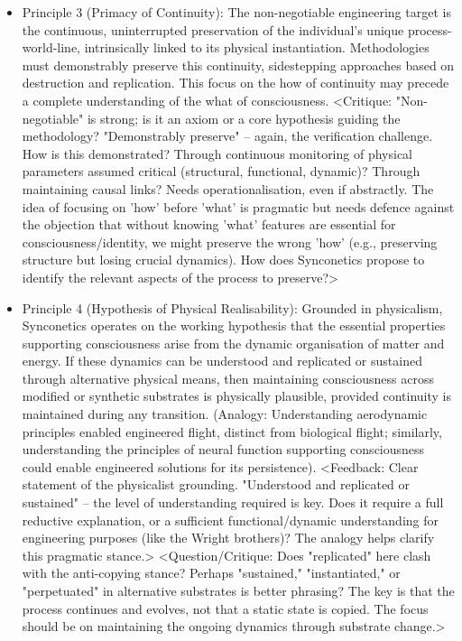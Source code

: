 \documentclass[10pt]{article}
\begin{document}
\begin{sloppypar}
\begin{itemize}
    \item Principle 3 (Primacy of Continuity): The non-negotiable engineering target is the continuous, uninterrupted preservation of the individual's unique process-world-line, intrinsically linked to its physical instantiation. Methodologies must demonstrably preserve this continuity, sidestepping approaches based on destruction and replication. This focus on the how of continuity may precede a complete understanding of the what of consciousness. <Critique: "Non-negotiable" is strong; is it an axiom or a core hypothesis guiding the methodology? "Demonstrably preserve" – again, the verification challenge. How is this demonstrated? Through continuous monitoring of physical parameters assumed critical (structural, functional, dynamic)? Through maintaining causal links? Needs operationalisation, even if abstractly. The idea of focusing on 'how' before 'what' is pragmatic but needs defence against the objection that without knowing 'what' features are essential for consciousness/identity, we might preserve the wrong 'how' (e.g., preserving structure but losing crucial dynamics). How does Synconetics propose to identify the relevant aspects of the process to preserve?>

    \item Principle 4 (Hypothesis of Physical Realisability): Grounded in physicalism, Synconetics operates on the working hypothesis that the essential properties supporting consciousness arise from the dynamic organisation of matter and energy. If these dynamics can be understood and replicated or sustained through alternative physical means, then maintaining consciousness across modified or synthetic substrates is physically plausible, provided continuity is maintained during any transition. (Analogy: Understanding aerodynamic principles enabled engineered flight, distinct from biological flight; similarly, understanding the principles of neural function supporting consciousness could enable engineered solutions for its persistence). <Feedback: Clear statement of the physicalist grounding. "Understood and replicated or sustained" – the level of understanding required is key. Does it require a full reductive explanation, or a sufficient functional/dynamic understanding for engineering purposes (like the Wright brothers)? The analogy helps clarify this pragmatic stance.> <Question/Critique: Does "replicated" here clash with the anti-copying stance? Perhaps "sustained," "instantiated," or "perpetuated" in alternative substrates is better phrasing? The key is that the process continues and evolves, not that a static state is copied. The focus should be on maintaining the ongoing dynamics through substrate change.>


\end{itemize}
\end{sloppypar}
\end{document}

